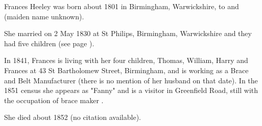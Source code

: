 
Frances Heeley was born about 1801 in Birmingham, Warwickshire, to  and  (maiden name unknown).

She married  on 2 May 1830 at St Philips, Birmingham, Warwickshire and they had five children (see page \pageref{Thomas_Elias_Hancox}).

In 1841, Frances is living with her four children, Thomas, William, Harry and Frances at 43 St Bartholomew Street, Birmingham,   and is working as a Brace and Belt Manufacturer  \cite{FrancesHeeleyWork} (there is no mention of her husband on that date).  In the 1851 census she appears as "Fanny" and is a visitor in Greenfield Road, still with the occupation of brace maker .

She died about 1852 (no citation available).
